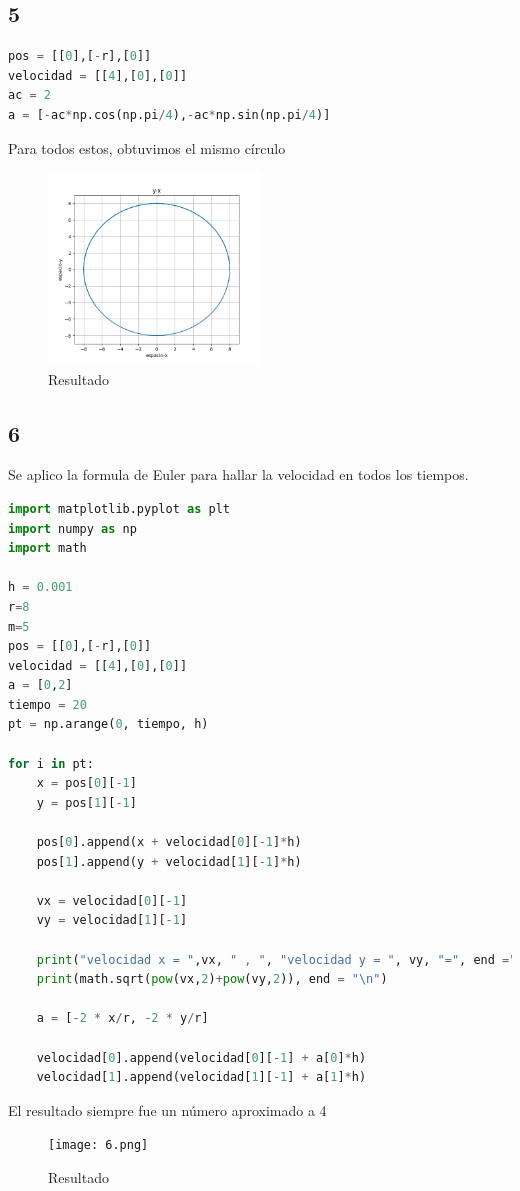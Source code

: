 \documentclass{article}
\begin{document}
\subsection{5}
\begin{lstlisting}[language=Python,caption=Desafío 1.1]
pos = [[0],[-r],[0]]
velocidad = [[4],[0],[0]]
ac = 2
a = [-ac*np.cos(np.pi/4),-ac*np.sin(np.pi/4)]
\end{lstlisting}
Para todos estos, obtuvimos el mismo círculo
\begin{figure}[H]
    \centering
    \includegraphics[width=0.5\textwidth]{1.png}
    \caption{Resultado}
\end{figure}

\subsection{6}
Se aplico la formula de Euler para hallar la velocidad en todos los tiempos.
\begin{lstlisting}[language=Python,caption=Desafío 1.1]
import matplotlib.pyplot as plt
import numpy as np
import math

h = 0.001
r=8
m=5
pos = [[0],[-r],[0]]
velocidad = [[4],[0],[0]]
a = [0,2]
tiempo = 20
pt = np.arange(0, tiempo, h)

for i in pt:
    x = pos[0][-1]
    y = pos[1][-1]

    pos[0].append(x + velocidad[0][-1]*h)
    pos[1].append(y + velocidad[1][-1]*h)

    vx = velocidad[0][-1]
    vy = velocidad[1][-1]

    print("velocidad x = ",vx, " , ", "velocidad y = ", vy, "=", end ="" )
    print(math.sqrt(pow(vx,2)+pow(vy,2)), end = "\n")

    a = [-2 * x/r, -2 * y/r]

    velocidad[0].append(velocidad[0][-1] + a[0]*h)
    velocidad[1].append(velocidad[1][-1] + a[1]*h)
\end{lstlisting}
El resultado siempre fue un número aproximado a 4
\begin{figure}[H]
    \centering
    \texttt{[image: 6.png]}
    \caption{Resultado}
\end{figure}
\end{document}
